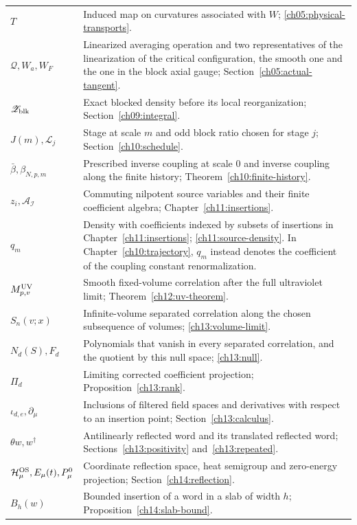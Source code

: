 {\begin{longtable}{@{}p{}p{}@{}}
$T$ & Induced map on curvatures associated with $W$; \eqref{ch05:physical-transports}.\\
$\mathcal Q,W_a,W_F$ & Linearized averaging operation and two representatives of the linearization of the critical configuration, the smooth one and the one in the block axial gauge; Section~\ref{ch05:actual-tangent}.\\[2pt]
$\mathscr Z_{\rm blk}$ & Exact blocked density before its local reorganization; Section~\ref{ch09:integral}.\\[2pt]
$J(m),\mathscr L_j$ & Stage at scale $m$ and odd block ratio chosen for stage $j$; Section~\ref{ch10:schedule}.\\[2pt]
$\bar\beta,\beta_{N,p,m}$ & Prescribed inverse coupling at scale $0$ and inverse coupling along the finite history; Theorem~\ref{ch10:finite-history}.\\[2pt]
$z_i,\mathcal A_{\mathcal I}$ & Commuting nilpotent source variables and their finite coefficient algebra; Chapter~\ref{ch11:insertions}.\\[2pt]
$q_m$ & Density with coefficients indexed by subsets of insertions in Chapter~\ref{ch11:insertions}; \eqref{ch11:source-density}. In Chapter~\ref{ch10:trajectory}, $q_m$ instead denotes the coefficient of the coupling constant renormalization.\\[2pt]
$M^{\rm UV}_{p,v}$ & Smooth fixed-volume correlation after the full ultraviolet limit; Theorem~\ref{ch12:uv-theorem}.\\[2pt]
$S_n(v;x)$ & Infinite-volume separated correlation along the chosen subsequence of volumes; \eqref{ch13:volume-limit}.\\[2pt]
$N_d(S),F_d$ & Polynomials that vanish in every separated correlation, and the quotient by this null space; \eqref{ch13:null}.\\[2pt]
$\Pi_d$ & Limiting corrected coefficient projection; Proposition~\ref{ch13:rank}.\\[2pt]
$\iota_{d,e},\partial_\mu$ & Inclusions of filtered field spaces and derivatives with respect to an insertion point; Section~\ref{ch13:calculus}.\\[2pt]
$\theta w,w^\dagger$ & Antilinearly reflected word and its translated reflected word; Sections~\ref{ch13:positivity} and~\ref{ch13:repeated}.\\
$\mathcal H_\mu^{\rm OS},E_\mu(t),P_\mu^0$ & Coordinate reflection space, heat semigroup and zero-energy projection; Section~\ref{ch14:reflection}.\\[2pt]
$B_h(w)$ & Bounded insertion of a word in a slab of width $h$; Proposition~\ref{ch14:slab-bound}.\\[2pt]

\end{longtable}}
